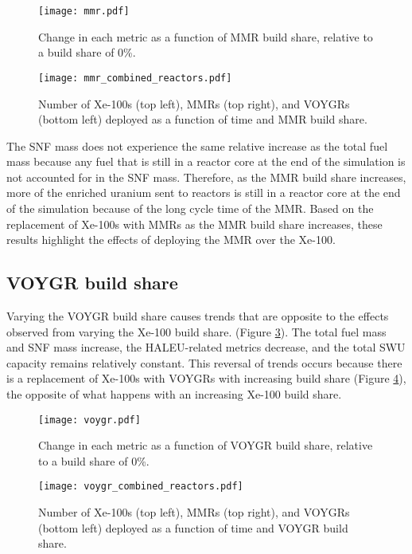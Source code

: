 \begin{figure}[h!]
    \centering
    \texttt{[image: mmr.pdf]}
    \caption{Change in each metric as a function of MMR build share, 
    relative to a build share of 0\%.}
    \label{fig:mmr_scenario7}
\end{figure}


\begin{figure}[h!]
    \centering
    \texttt{[image: mmr\_combined\_reactors.pdf]}
    \caption{Number of Xe-100s (top left), MMRs (top right), and 
    VOYGRs (bottom left) deployed as a function of time and 
    MMR build share.}
    \label{fig:mmr_reactors_s7}
\end{figure}

The \gls{SNF} mass does not experience the same 
relative increase as the total fuel mass because any fuel that is still in a 
reactor core at the end of the simulation is not accounted for in the 
\gls{SNF} mass. Therefore, as the \gls{MMR} build share increases, more 
of the enriched uranium sent to reactors is still in a reactor core
at the end of the simulation because of the long cycle time of the 
\gls{MMR}. 
Based on the replacement of Xe-100s with \glspl{MMR} as the \gls{MMR} 
build share increases, these results highlight the effects of deploying the
\gls{MMR} over the Xe-100. 

\subsection{VOYGR build share}
Varying the VOYGR build share causes trends that are opposite 
to the effects observed from varying the Xe-100 build share. 
(Figure 
\ref{fig:voygr_scenario7}). The total fuel mass and \gls{SNF} mass 
increase, the \gls{HALEU}-related metrics decrease, and the total 
\gls{SWU} capacity remains relatively constant. This reversal 
of trends occurs because there is a replacement of Xe-100s with VOYGRs
with increasing build share (Figure \ref{fig:voygr_reactors_s7}), 
the opposite of what happens with an increasing Xe-100 build share. 

\begin{figure}[h!]
    \centering
    \texttt{[image: voygr.pdf]}
    \caption{Change in each metric as a function of VOYGR build share, 
    relative to a build share of 0\%.}
    \label{fig:voygr_scenario7}
\end{figure}

\begin{figure}[h!]
    \centering
    \texttt{[image: voygr\_combined\_reactors.pdf]}
    \caption{Number of Xe-100s (top left), MMRs (top right), and 
    VOYGRs (bottom left) deployed as a function of time and 
    VOYGR build share.}
    \label{fig:voygr_reactors_s7}
\end{figure}

